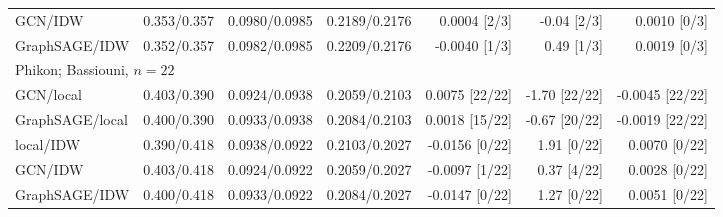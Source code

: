 \begin{table}[p]
\begin{tabular}{lrrrrrr}
GCN/IDW & 0.353/0.357 & 0.0980/0.0985 & 0.2189/0.2176 & 0.0004 [2/3] & -0.04 [2/3] & 0.0010 [0/3]\\
GraphSAGE/IDW & 0.352/0.357 & 0.0982/0.0985 & 0.2209/0.2176 & -0.0040 [1/3] & 0.49 [1/3] & 0.0019 [0/3]\\
\multicolumn{7}{l}{Phikon; Bassiouni, $n=22$}\\
GCN/local & 0.403/0.390 & 0.0924/0.0938 & 0.2059/0.2103 & 0.0075 [22/22] & -1.70 [22/22] & -0.0045 [22/22]\\
GraphSAGE/local & 0.400/0.390 & 0.0933/0.0938 & 0.2084/0.2103 & 0.0018 [15/22] & -0.67 [20/22] & -0.0019 [22/22]\\
local/IDW & 0.390/0.418 & 0.0938/0.0922 & 0.2103/0.2027 & -0.0156 [0/22] & 1.91 [0/22] & 0.0070 [0/22]\\
GCN/IDW & 0.403/0.418 & 0.0924/0.0922 & 0.2059/0.2027 & -0.0097 [1/22] & 0.37 [4/22] & 0.0028 [0/22]\\
GraphSAGE/IDW & 0.400/0.418 & 0.0933/0.0922 & 0.2084/0.2027 & -0.0147 [0/22] & 1.27 [0/22] & 0.0051 [0/22]\\
\bottomrule
\end{tabular}
\end{table}
